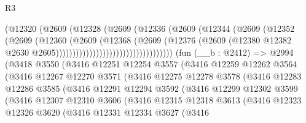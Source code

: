\begin{lexlean}{R3}
\begin{coremodule}
                                        (@12320
                                          (@2609
                                            (@12328
                                              (@2609
                                                (@12336
                                                  (@2609
                                                    (@12344
                                                      (@2609
                                                        (@12352
                                                          (@2609
                                                            (@12360
                                                              (@2609
                                                                (@12368
                                                                  (@2609
                                                                    (@12376
                                                                      (@2609
                                                                        (@12380
                                                                          @12382
                                                                          @2630
                                                                          @2605)))))))))))))))))))))))))))))))))))
    (fun (__b : @2412) =>
    @2994
      (@3418
        @3550
        (@3416
          @12251
          @12254
          @3557
          (@3416
            @12259
            @12262
            @3564
            (@3416
              @12267
              @12270
              @3571
              (@3416
                @12275
                @12278
                @3578
                (@3416
                  @12283
                  @12286
                  @3585
                  (@3416
                    @12291
                    @12294
                    @3592
                    (@3416
                      @12299
                      @12302
                      @3599
                      (@3416
                        @12307
                        @12310
                        @3606
                        (@3416
                          @12315
                          @12318
                          @3613
                          (@3416
                            @12323
                            @12326
                            @3620
                            (@3416
                              @12331
                              @12334
                              @3627
                              (@3416

\end{coremodule}
\end{lexlean}
